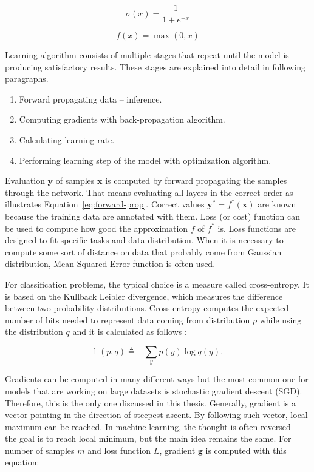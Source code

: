 \begin{equation}
    \label{eq:sigmoid}
    \sigma (x) = \frac{1}{1 + e^{-x}}
\end{equation}

\begin{equation}
    \label{eq:relu}
    f(x) = \max(0, x)
\end{equation}

Learning algorithm consists of multiple stages that repeat until the model is producing satisfactory results. These stages are explained into detail in following paragraphs.

\begin{enumerate}
    \item Forward propagating data -- inference.
    \item Computing gradients with back-propagation algorithm.
    \item Calculating learning rate.
    \item Performing learning step of the model with optimization algorithm.
\end{enumerate}

Evaluation $\pmb y$ of samples $\pmb x$ is computed by forward propagating the samples through the network. That means evaluating all layers in the correct order as illustrates Equation~\ref{eq:forward-prop}. Correct values $\pmb y^*=f^*(\pmb x)$ are known because the training data are annotated with them. Loss (or cost) function can be used to compute how good the approximation $f$ of $f^*$ is. Loss functions are designed to fit specific tasks and data distribution. When it is necessary to compute some sort of distance on data that probably come from Gaussian distribution, Mean Squared Error function is often used.

For classification problems, the typical choice is a measure called cross-entropy. It is based on the Kullback Leibler divergence, which measures the difference between two probability distributions. Cross-entropy computes the expected number of bits needed to represent data coming from distribution $p$ while using the distribution $q$ and it is calculated as follows \cite{pml1Book}:

\begin{equation}
    \label{eq:cross-entropy}
    \mathbb{H}(p, q) \triangleq -\sum\limits_{y} p(y) \log q(y).
\end{equation}

Gradients can be computed in many different ways but the most common one for models that are working on large datasets is stochastic gradient descent (SGD). Therefore, this is the only one discussed in this thesis. Generally, gradient is a vector pointing in the direction of steepest ascent. By following such vector, local maximum can be reached. In machine learning, the thought is often reversed -- the goal is to reach local minimum, but the main idea remains the same. For number of samples $m$ and loss function $L$, gradient $\pmb g$ is computed with this equation: 

